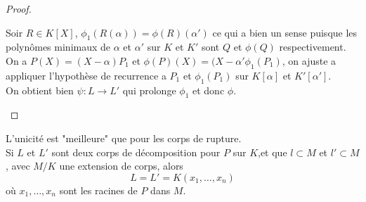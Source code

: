 \begin{proof}
\begin{itemize}
		      Soir $R\in K[X]$, $\phi_1(R(\alpha)) = \phi(R)(\alpha')$ ce qui a bien un sense puisque les polynômes minimaux de $\alpha$ et
		      $\alpha'$ sur $K$ et $K'$ sont $Q$ et $\phi(Q)$ respectivement.\\

		      On a $P(X) = (X-\alpha)P_1$ et $\phi(P)(X) = (X-\alpha'\phi_1(P_1)$, on ajuste a appliquer l'hypothèse de recurrence a $P_1$ et $\phi_1(P_1)$
		      sur $K[\alpha]$ et $K'[\alpha']$.\\
		      On obtient bien $\psi : L \to L'$ qui prolonge $\phi_1$ et donc $\phi$.
	\end{itemize}
\end{proof}


\begin{remarque}
	L'unicité est "meilleure" que pour les corps de rupture.\\
	Si $L$ et $L'$ sont deux corps de décomposition pour $P$ sur $K$,et que
	$l \subset M$ et $l' \subset M$, avec $M/K$ une extension de corps, alors
	$$L = L' = K(x_1, \ldots, x_n)$$
	où $x_1, \ldots, x_n$ sont les racines de $P$ dans $M$.
\end{remarque}
